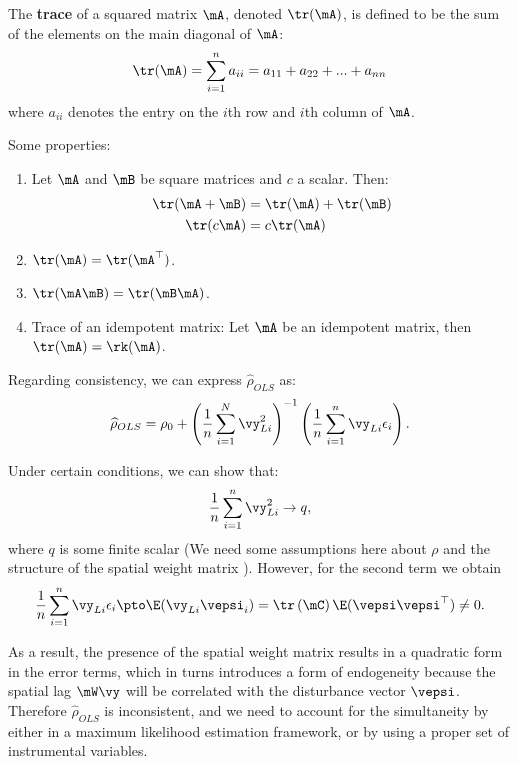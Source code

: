 \documentclass[english,12pt]{book}\usepackage[]{graphicx}\usepackage[]{xcolor}
\begin{document}
\begin{definition}\label{definition:trace}
  The \textbf{trace} of a squared matrix $\mA$, denoted $\tr(\mA)$, is defined to be the sum of the elements on the main diagonal of $\mA$:
  \begin{equation}
    \tr(\mA) = \sum_{i = 1}^n a_{ii} = a_{11} + a_{22} + ... + a_{nn}
  \end{equation}
  where $a_{ii}$ denotes the entry on the $i$th row and $i$th column of $\mA$. 
  
 Some properties:
 \begin{enumerate}
  \item Let $\mA$ and $\mB$ be square matrices and $c$ a scalar. Then:
  \begin{align}
    \tr(\mA + \mB) & = \tr(\mA) + \tr(\mB) \\
    \tr(c\mA) & = c\tr(\mA)
  \end{align}
  \item $\tr(\mA) = \tr(\mA^{\top})$. 
  \item $\tr(\mA\mB) = \tr(\mB\mA)$.
  \item Trace of an idempotent matrix: Let $\mA$ be an idempotent matrix, then $\tr(\mA)= \rk(\mA)$. 
 \end{enumerate}
\end{definition}

Regarding consistency, we can express $\widehat{\rho}_{OLS}$ as: 
\begin{equation}
          \widehat{\rho}_{OLS} = \rho_0 + \left(\frac{1}{n}\sum_{i = 1}^N \vy_{Li}^2\right)^{-1}\left(\frac{1}{n}\sum_{i = 1}^{n}\vy_{Li}\epsilon_i\right).
\end{equation}

Under certain conditions, we can show that:
\begin{equation}
\frac{1}{n}\sum_{i = 1}^n \vy_{Li}^2 \to q,
\end{equation}
%
where $q$ is some finite scalar (We need some assumptions here about $\rho$ and the structure of the spatial weight matrix ). However, for the second term we obtain
\begin{equation}
  \frac{1}{n}\sum_{i = 1}^{n}\vy_{Li}\epsilon_i \pto \E(\vy_{Li}\vepsi_i) = \tr \left(\mC\right) \E(\vepsi\vepsi^\top) \neq 0.
\end{equation}

As a result, the presence of the spatial weight matrix results in a quadratic form in the error terms, which in turns introduces a form of endogeneity because the spatial lag $\mW\vy$ will be correlated with the disturbance vector $\vepsi$. Therefore $\widehat{\rho}_{OLS}$ is inconsistent, and we need to account for the simultaneity by either in a maximum likelihood estimation framework, or by using a proper set of instrumental variables.
\end{document}
